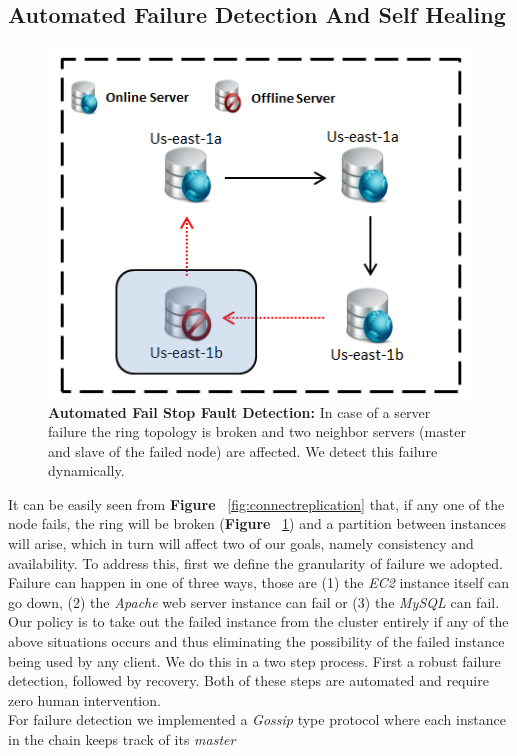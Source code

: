 \documentclass[12pt]{article}
\begin{document}
\subsection{Automated Failure Detection And Self Healing}
\label{fault}
\begin{figure}[H] \centering \includegraphics[scale=0.8]{Images/figure4.PNG}
\caption{\textbf{Automated Fail Stop Fault Detection:} In case of a server
failure the ring topology is broken and two neighbor servers (master and slave of the failed node)
are affected. We detect this failure dynamically.} \label{fig:failuredetection}
\end{figure} It can be easily seen from \textbf{Figure
}~\ref{fig:connectreplication} that, if any one of the node fails, the ring will
be broken (\textbf{Figure }~\ref{fig:failuredetection}) and a partition between
instances will arise, which in turn will affect two of our goals, namely
consistency and availability. To address this, first we define the granularity
of failure we adopted. Failure can happen in one of three ways, those are (1)
the \emph{EC2} instance itself can go down, (2) the  \emph{Apache} web server
instance can fail or (3) the \emph{MySQL} can fail. Our policy is to take out
the failed instance from the cluster entirely if any of the above situations
occurs and thus eliminating the possibility of the failed instance being used by
any client. We do this in a two step process. First a robust failure detection,
followed by recovery. Both of these steps are automated and require zero human
intervention. \\ For failure detection we implemented a \emph{Gossip} type
protocol where each instance in the chain keeps track of its \emph{master}
\end{document}
